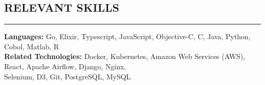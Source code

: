 \documentclass{res}
\begin{document}
\begin{resume}
		\section{{RELEVANT SKILLS}}
    \noindent\rule[0.5ex]{\linewidth}{1pt}
			{\bf Languages:} Go, Elixir, Typescript, JavaScript, Objective-C, C, Java, Python, Cobol, Matlab, R \\
			{\bf Related Technologies:} Docker, Kubernetes, Amazon Web Services (AWS), React, Apache Airflow, Django, Nginx,\ \\ Selenium, D3, Git, PostgreSQL, MySQL

	\end{resume}
\end{document}
